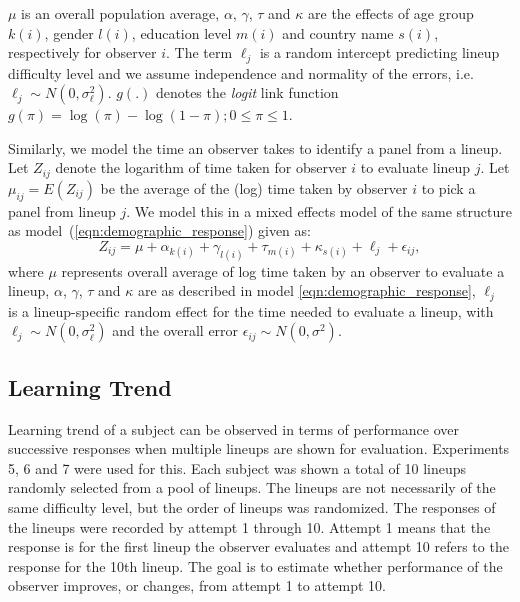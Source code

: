 \documentclass[10pt]{article}\usepackage[]{graphicx}\usepackage[]{color}
\newcommand{\hh}[1]{{\color{magenta} #1}}
\begin{document}
 $\mu$ is an overall population average, %
 $\alpha$, $\gamma$, $\tau$ and  $\kappa$ are the effects of age group $k(i)$, gender $l(i)$, education level $m(i)$ and country name $s(i)$, respectively for observer $i$. The term $\ell_j$ is a random intercept predicting lineup difficulty level and we assume independence and normality of the errors, i.e.\ $\ell_j \sim N(0, \sigma_\ell^2)$.  $g(.)$ denotes the {\it logit} link function $g(\pi)=\log(\pi) - \log(1-\pi); 0 \le \pi \le 1$.


Similarly, we model the  time  an observer takes to identify a panel from a lineup. Let $Z_{ij}$ denote the logarithm of time taken for  observer $i$ to evaluate  lineup $j$. Let $\mu_{ij}=  E(Z_{ij})$ be the average of the (log) time taken by  observer $i$ to pick a panel from lineup $j$. We model this in a mixed effects model of the same structure as model~(\ref{eqn:demographic_response}) given as:
\begin{equation} \label{eqn:demographic_time}
Z_{ij} = \mu + \alpha_{k(i)} + \gamma_{l(i)} + \tau_{m(i)}+ \kappa_{s(i)} + \ell_j+ \epsilon_{ij},  
\end{equation}
where $\mu$ represents overall average of log time taken by an observer to evaluate a lineup, $\alpha$, $\gamma$, $\tau$ and  $\kappa$ are as described in model \eqref{eqn:demographic_response}, $\ell_j$ is a lineup-specific random effect for the time needed to evaluate a lineup, with $\ell_j \sim N(0, \sigma_\ell^2)$ and the overall error $\epsilon_{ij} \sim N(0, \sigma^2)$.  

\subsection{Learning Trend} Learning trend of a subject can be observed in terms of performance over successive responses when multiple lineups are shown for evaluation. Experiments 5, 6 and 7 were used for this. Each subject was shown a total of 10 lineups randomly selected from a pool of lineups. The lineups are not necessarily of the same difficulty level, but the order of lineups was randomized. The responses of the lineups were recorded by attempt 1 through 10. Attempt 1 means that the response is for the first lineup the observer evaluates and attempt 10 refers to the response for the 10th lineup. The goal is to estimate whether performance of the observer improves, or changes, from attempt 1 to attempt 10. 
\end{document}
